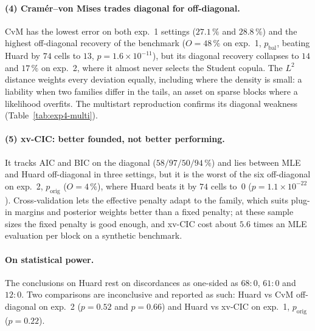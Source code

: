 \documentclass[11pt,a4paper]{article}
\newcommand{\porig}{p_{\text{orig}}}
\newcommand{\pbal}{p_{\text{bal}}}
\begin{document}
\paragraph{(4) Cram\'er--von Mises trades diagonal for off-diagonal.} CvM
has the lowest error on both exp.~1 settings ($27.1\,\%$ and $28.8\,\%$) and
the highest off-diagonal recovery of the benchmark ($O=48\,\%$ on exp.~1,
$\pbal$, beating Huard by $74$ cells to $13$, $p=1.6\times10^{-11}$), but its
diagonal recovery collapses to $14$ and $17\,\%$ on exp.~2, where it almost
never selects the Student copula. The $L^2$ distance weights every deviation
equally, including where the density is small: a liability when two families
differ in the tails, an asset on sparse blocks where a likelihood overfits.
The multistart reproduction confirms its diagonal weakness
(Table~\ref{tab:exp4-multi}).

\paragraph{(5) xv-CIC: better founded, not better performing.} It tracks
AIC and BIC on the diagonal ($58/97/50/94\,\%$) and lies between MLE and
Huard off-diagonal in three settings, but it is the worst of the six
off-diagonal on exp.~2, $\porig$ ($O=4\,\%$), where Huard beats it by $74$
cells to~$0$ ($p=1.1\times10^{-22}$). Cross-validation lets the effective
penalty adapt to the family, which suits plug-in margins and posterior
weights better than a fixed penalty; at these sample sizes the fixed penalty
is good enough, and xv-CIC cost about $5.6$ times an MLE evaluation per block
on a synthetic benchmark.

\paragraph{On statistical power.} The conclusions on Huard rest on
discordances as one-sided as $68{:}0$, $61{:}0$ and $12{:}0$. Two
comparisons are inconclusive and reported as such: Huard vs CvM off-diagonal
on exp.~2 ($p=0.52$ and $p=0.66$) and Huard vs xv-CIC on exp.~1, $\porig$
($p=0.22$).
\end{document}
